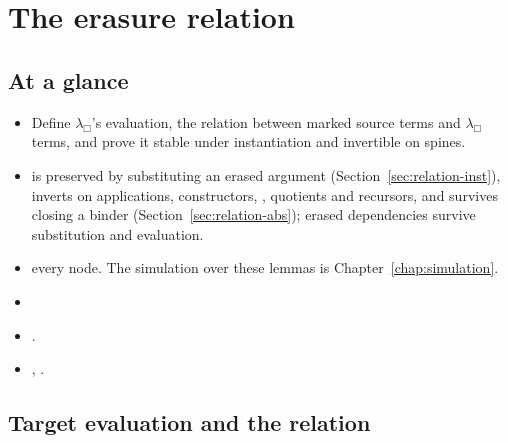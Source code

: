 \chapter{The erasure relation}\label{chap:relation}

\section*{At a glance}
\begin{itemize}
\item {} Define $\lambda_\Box$'s evaluation, the relation between marked source terms and
  $\lambda_\Box$ terms, and prove it stable under instantiation and invertible on spines.
\item {}  is preserved by substituting an erased argument
  (Section~\ref{sec:relation-inst}), inverts on applications, constructors, , quotients and recursors, and survives closing a binder (Section~\ref{sec:relation-abs}); erased dependencies survive substitution and evaluation.
\item {} \stProved{} every node. The simulation over these lemmas is Chapter~\ref{chap:simulation}.
\item {} 
\item {} .
\item {} , .
\end{itemize}

\section{Target evaluation and the relation}\label{sec:relation-def}

